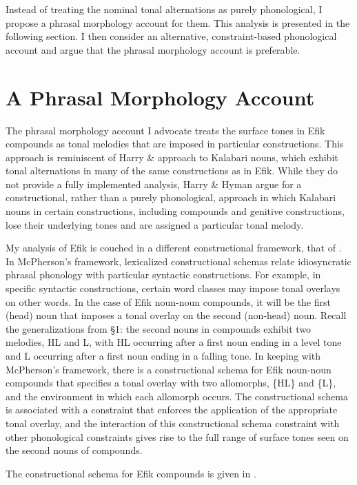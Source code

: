 \documentclass[output=paper]{langscibook}
\begin{document}
Instead of treating the nominal tonal alternations as purely phonological, I propose a phrasal morphology account for them. This analysis is presented in the following section. I then consider an alternative, constraint-based phonological account and argue that the phrasal morphology account is preferable. 

\section{A Phrasal Morphology Account} 

The phrasal morphology account I advocate treats the surface tones in Efik compounds as tonal melodies that are imposed in particular constructions. This approach is reminiscent of Harry \&  approach to Kalabari nouns, which exhibit tonal alternations in many of the same constructions as in Efik. While they do not provide a fully implemented analysis, Harry \& Hyman argue for a constructional, rather than a purely phonological, approach in which Kalabari nouns in certain constructions, including compounds and genitive constructions, lose their underlying tones and are assigned a particular tonal melody. 

My analysis of Efik is couched in a different constructional framework, that of \citealt{McPherson2014}. In McPherson’s framework, lexicalized constructional schemas relate idiosyncratic phrasal phonology with particular syntactic constructions. For example, in specific syntactic constructions, certain word classes may impose tonal overlays on other words. In the case of Efik noun-noun compounds, it will be the first (head) noun that imposes a tonal overlay on the second (non-head) noun. Recall the generalizations from §1: the second nouns in compounds exhibit two melodies, HL and L, with HL occurring after a first noun ending in a level tone and L occurring after a first noun ending in a falling tone. In keeping with McPherson’s framework, there is a constructional schema for Efik noun-noun compounds that specifies a tonal overlay with two allomorphs, \{HL\} and \{L\}, and the environment in which each allomorph occurs. The constructional schema is associated with a constraint that enforces the application of the appropriate tonal overlay, and the interaction of this constructional schema constraint with other phonological constraints gives rise to the full range of surface tones seen on the second nouns of compounds. 

The constructional schema for Efik compounds is given in .
\end{document}
